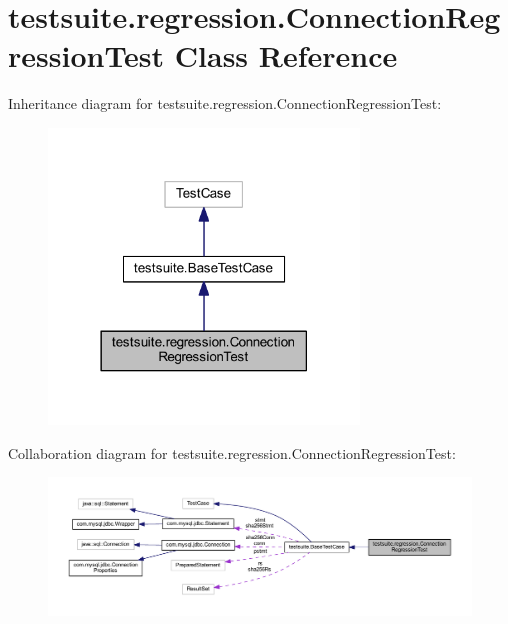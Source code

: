 \hypertarget{classtestsuite_1_1regression_1_1_connection_regression_test}{}\section{testsuite.\+regression.\+Connection\+Regression\+Test Class Reference}
\label{classtestsuite_1_1regression_1_1_connection_regression_test}


Inheritance diagram for testsuite.\+regression.\+Connection\+Regression\+Test\+:
\nopagebreak
\begin{figure}[H]
\begin{center}
\leavevmode
\includegraphics[width=234pt]{classtestsuite_1_1regression_1_1_connection_regression_test__inherit__graph}
\end{center}
\end{figure}


Collaboration diagram for testsuite.\+regression.\+Connection\+Regression\+Test\+:
\nopagebreak
\begin{figure}[H]
\begin{center}
\leavevmode
\includegraphics[width=350pt]{classtestsuite_1_1regression_1_1_connection_regression_test__coll__graph}
\end{center}
\end{figure}
